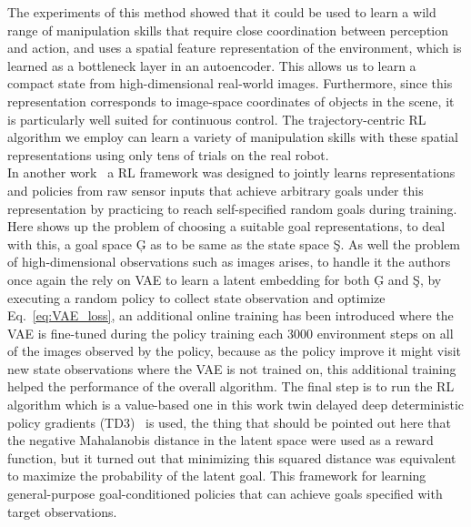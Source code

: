 The experiments of this method showed that it could be used to learn a wild range of manipulation skills that require close coordination between perception and
action, and uses a spatial feature representation of the environment, which is learned as a bottleneck layer in
an autoencoder. This allows us to learn a compact state from high-dimensional real-world images. Furthermore, since this
representation corresponds to image-space coordinates of objects in the scene, it is particularly well suited for continuous control. The trajectory-centric RL algorithm we employ can learn a variety of manipulation skills with these spatial
representations using only tens of trials on the real robot.\\

In another work~\cite{nair2018visual} a RL framework was designed to jointly learns representations and policies from raw sensor inputs that achieve arbitrary goals under this representation by practicing to reach self-specified random goals during training. Here shows up the problem of choosing a suitable goal representations, to deal with this, a goal space \c{G} as to be same as the state space \c{S}. As well the problem of high-dimensional observations such as images arises, to handle it the authors once again the rely on VAE to learn a latent embedding for both \c{G} and \c{S}, by executing a random policy to collect state observation and optimize Eq.~\ref{eq:VAE_loss}, an additional online training has been introduced where the VAE is fine-tuned during the policy training each 3000 environment steps on all of the images observed by the policy, because as the policy improve it might visit new state observations where the VAE is not trained on, this additional training helped the performance of the overall algorithm. The final step is to run the RL algorithm which is a value-based one in this work twin delayed deep deterministic
policy gradients (TD3)~\cite{fujimoto2018addressing} is used, the thing that should be pointed out here that the negative Mahalanobis distance in the latent space were used as a reward function, but it turned out that minimizing this squared distance was equivalent to maximize the probability of the latent goal. This framework for learning general-purpose goal-conditioned policies that can achieve goals specified with target observations.\\


